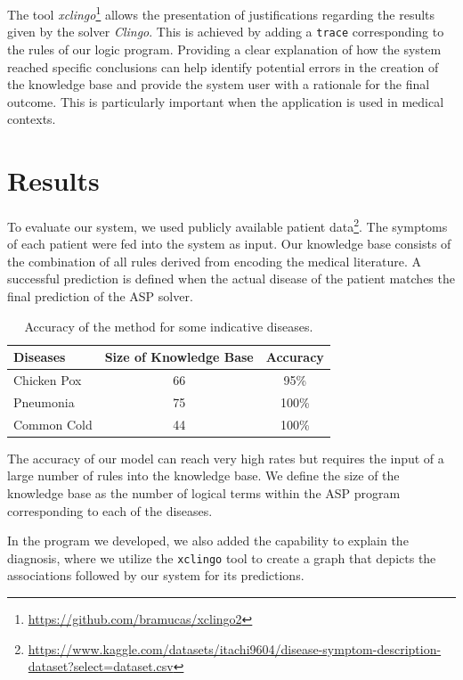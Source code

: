 \documentclass[10pt,leqno]{amsart}
\newcommand{\src}[1]{\texttt{#1}}
\begin{document}
The tool \textit{xclingo}\footnote{\url{https://github.com/bramucas/xclingo2}} \cite{Cabalar_2020} allows the presentation of justifications regarding the results given by the solver \textit{Clingo}. This is achieved by adding a \src{trace} corresponding to the rules of our logic program. Providing a clear explanation of how the system reached specific conclusions can help identify potential errors in the creation of the knowledge base and provide the system user with a rationale for the final outcome. This is particularly important when the application is used in medical contexts.

\section{Results}

To evaluate our system, we used publicly available patient data\footnote{\url{https://www.kaggle.com/datasets/itachi9604/disease-symptom-description-dataset?select=dataset.csv}}. The symptoms of each patient were fed into the system as input. Our knowledge base consists of the combination of all rules derived from encoding the medical literature. A successful prediction is defined when the actual disease of the patient matches the final prediction of the ASP solver.

\begin{table}[h]
    \centering
    \begin{tabular}{lcc}
    \hline
    Diseases & Size of Knowledge Base & Accuracy \\
    \hline
    \hline
    Chicken Pox      &  66  & 95\% \\
    Pneumonia        &  75  & 100\% \\
    Common Cold    &   44 & 100\% \\
    \hline
    \end{tabular}
    \caption{Accuracy of the method for some indicative diseases.}
\end{table}

The accuracy of our model can reach very high rates but requires the input of a large number of rules into the knowledge base. We define the size of the knowledge base as the number of logical terms within the ASP program corresponding to each of the diseases.

In the program we developed, we also added the capability to explain the diagnosis, where we utilize the \src{xclingo} tool to create a graph that depicts the associations followed by our system for its predictions.
\end{document}
